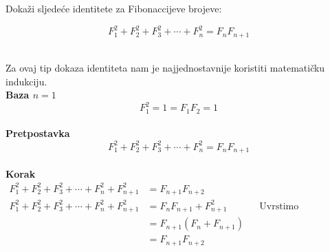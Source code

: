 \documentclass[exam.tex]{subfiles}
\begin{document}
	\begin{subtask}
		Dokaži sljedeće identitete za Fibonaccijeve brojeve:
	
		\[ F^2_1 + F^2_2 + F^2_3 + \cdots + F^2_n = F_n F_{n + 1} \] \\
	\end{subtask}	
	
	Za ovaj tip dokaza identiteta nam je najjednostavnije koristiti matematičku indukciju. \\
	
	\textbf{Baza \(n = 1\)}
	\[ F^2_1 = 1 = F_1 F_2 = 1 \] \\
	
	\textbf{Pretpostavka}
	\[ F^2_1 + F^2_2 + F^2_3 + \cdots + F^2_n = F_n F_{n + 1} \] \\
	
	\textbf{Korak}
	\begin{align*}
		F^2_1 + F^2_2 + F^2_3 + \cdots + F^2_n + F^2_{n + 1} &= F_{n + 1} F_{n + 2} \\
		F^2_1 + F^2_2 + F^2_3 + \cdots + F^2_n + F^2_{n + 1} &= F_n F_{n + 1} + F^2_{n + 1} && \text{Uvrstimo pretpostavku} \\
		&= F_{n + 1} (F_n + F_{n + 1}) \\
		&= F_{n + 1} F_{n + 2}
	\end{align*}
\end{document}
